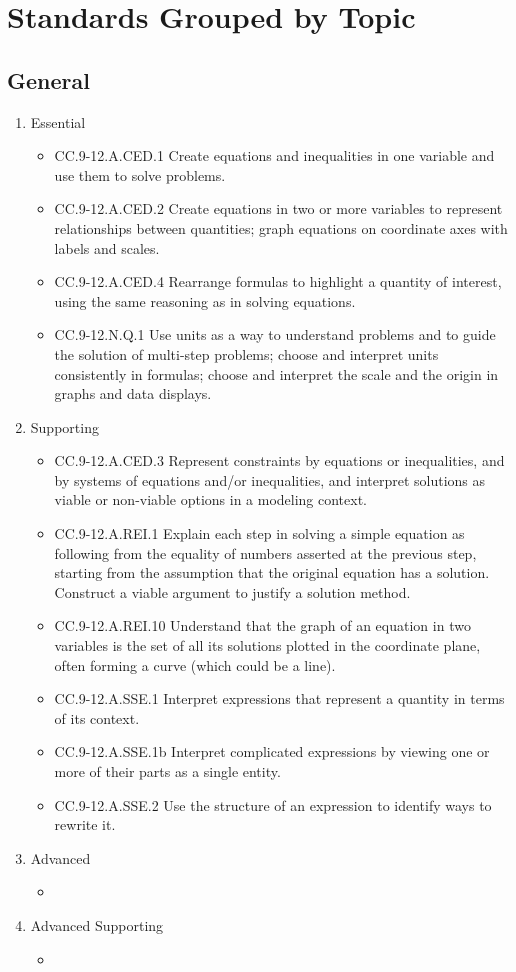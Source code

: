 \documentclass{article}
\begin{document}
\section*{Standards Grouped by Topic}
\subsection*{General}
\begin{enumerate}
	\item Essential
	\begin{itemize}
		\item CC.9-12.A.CED.1  Create equations and inequalities in one variable and use them to solve problems. 
		\item CC.9-12.A.CED.2  Create equations in two or more variables to represent relationships between quantities; graph equations on coordinate axes with labels and scales.
		\item CC.9-12.A.CED.4  Rearrange formulas to highlight a quantity of interest, using the same reasoning as in solving equations. 
		\item CC.9-12.N.Q.1  Use units as a way to understand problems and to guide the solution of multi-step problems; choose and interpret units consistently in formulas; choose and interpret the scale and the origin in graphs and data displays.
	\end{itemize}		
	\item Supporting
	\begin{itemize}
		\item CC.9-12.A.CED.3  Represent constraints by equations or inequalities, and by systems of equations and/or inequalities, and interpret solutions as viable or non-viable options in a modeling context. 
		\item CC.9-12.A.REI.1   Explain each step in solving a simple equation as following from the equality of numbers asserted at the previous step, starting from the assumption that the original equation has a solution. Construct a viable argument to justify a solution method.
		\item CC.9-12.A.REI.10  Understand that the graph of an equation in two variables is the set of all its solutions plotted in the coordinate plane, often forming a curve (which could be a line).
		\item CC.9-12.A.SSE.1  Interpret expressions that represent a quantity in terms of its context.
		\item CC.9-12.A.SSE.1b Interpret complicated expressions by viewing one or more of their parts as a single entity.
		\item CC.9-12.A.SSE.2  Use the structure of an expression to identify ways to rewrite it.
	\end{itemize}
	\item Advanced
	\begin{itemize}
		\item
	\end{itemize}
	\item Advanced Supporting
	\begin{itemize}
		\item
	\end{itemize}
\end{enumerate}
\newpage
\end{document}

